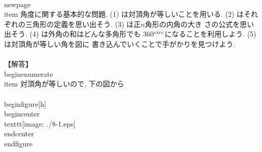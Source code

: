  \\newpage
 \\item 角度に関する基本的な問題. (1) は対頂角が等しいことを用いる. (2)
       はそれぞれの三角形の定義を思い出そう. (3) は正$n$角形の内角の大き
       さの公式を思い出そう. (4) は外角の和はどんな多角形でも
       360$^{\\circ}$になることを利用しよう. (5) は対頂角が等しい角を図に
       書き込んでいくことで手がかりを見つけよう. \\\\
       【解答】
       \\begin{enumerate}
	\\item 対頂角が等しいので, 下の図から
	      \\[
	       x=180^{\\circ}-(48^{\\circ}+75^{\\circ})=\\underline{57^{\\circ}}
	      \\]
	      \\begin{figure}[h]
	       \\begin{center}
		\\texttt{[image: ./8-1.eps]}
	       \\end{center}
	      \\end{figure}

